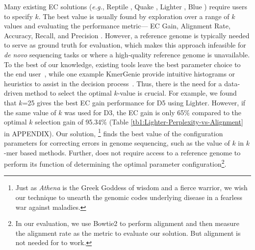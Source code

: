 Many existing EC solutions (\textit{e.g.}, Reptile \cite{yang2010reptile}, Quake \cite{kelley2010quake}, Lighter \cite{song2014lighter}, Blue \cite{greenfield2014blue}) require users to specify $k$. The best value is usually found by exploration over a range of $k$ values \cite{kao2011echo} and evaluating the performance metric--- \eg EC Gain, Alignment Rate, Accuracy, Recall, and Precision \cite{heydari2017evaluation}.
However, a reference genome is typically needed to serve as ground truth for evaluation, which makes this approach infeasible for \textit{de novo} sequencing tasks or where a high-quality reference genome is unavailable. 
To the best of our knowledge, existing tools leave the best parameter choice to the end user~\cite{peng2010idba, mahadik2017scalable}, while one example KmerGenie provide intuitive histograms or heuristics to assist in the decision process~\cite{chikhi2013informed}.
Thus, there is the need for a data-driven method to select the optimal $k$-value is crucial. 
For example, we found that $k$=25 gives the best EC gain performance for D5 using Lighter. However, if the same value of $k$ was used for D3, the EC gain is only 65\% compared to the optimal $k$ selection gain of 95.34\% (Table \ref{tb1:Lighter-Perplexity-vs-Alignment} in APPENDIX).
Our solution, {\em \name}\footnote{Just as \textit{Athena} is the Greek Goddess of wisdom and a fierce warrior, we wish our technique to unearth the genomic codes underlying disease in a fearless war against maladies.} finds the best value of the configuration parameters
for correcting errors in genome sequencing, such as the value of $k$ in $k$-mer based methods. Further, \name does not require access to a reference genome to perform its function of determining the optimal parameter configuration\footnote{In our evaluation, we use Bowtie2 to perform alignment and then measure the alignment rate as the metric to evaluate our solution. But alignment is not needed for \name to work.}. 

